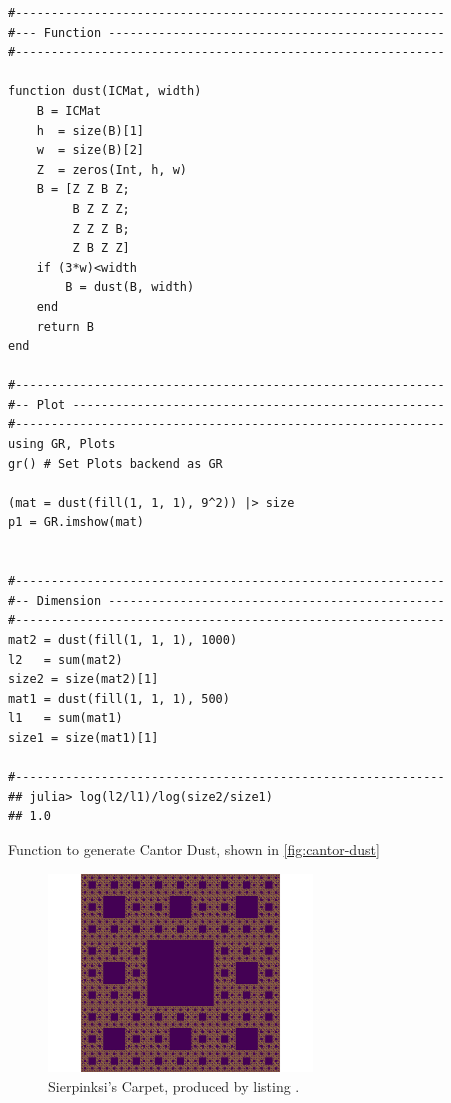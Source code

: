 \documentclass[a4paper,11pt,twoside]{article}
\begin{document}
\begin{listing}[htbp]
\begin{verbatim}
#------------------------------------------------------------
#--- Function -----------------------------------------------
#------------------------------------------------------------

function dust(ICMat, width)
    B = ICMat
    h  = size(B)[1]
    w  = size(B)[2]
    Z  = zeros(Int, h, w)
    B = [Z Z B Z;
         B Z Z Z;
         Z Z Z B;
         Z B Z Z]
    if (3*w)<width
        B = dust(B, width)
    end
    return B
end

#------------------------------------------------------------
#-- Plot ----------------------------------------------------
#------------------------------------------------------------
using GR, Plots
gr() # Set Plots backend as GR

(mat = dust(fill(1, 1, 1), 9^2)) |> size
p1 = GR.imshow(mat)


#------------------------------------------------------------
#-- Dimension -----------------------------------------------
#------------------------------------------------------------
mat2 = dust(fill(1, 1, 1), 1000)
l2   = sum(mat2)
size2 = size(mat2)[1]
mat1 = dust(fill(1, 1, 1), 500)
l1   = sum(mat1)
size1 = size(mat1)[1]

#------------------------------------------------------------
## julia> log(l2/l1)/log(size2/size1)
## 1.0

\end{verbatim}
\caption{\label{l-cant-dust}Function to generate Cantor Dust, shown in \ref{fig:cantor-dust}}
\end{listing}


\begin{figure}[htbp]
\centering
\includegraphics[width=7cm]{media/sierpinsky_carpet.png}
\caption{\label{fig:square-carpet}Sierpinksi's Carpet, produced by listing .}
\end{figure}
\end{document}
